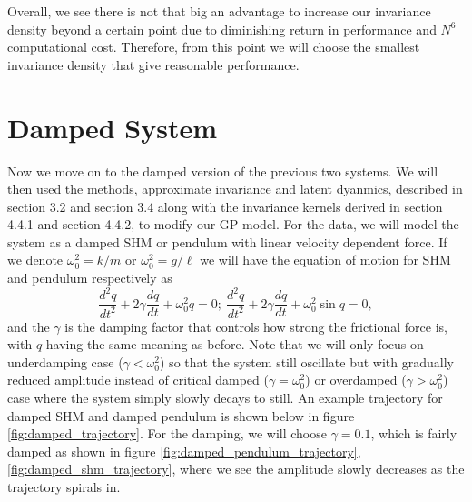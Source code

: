 \documentclass{statsmsc}
\begin{document}
Overall, we see there is not that big an advantage to increase our invariance density beyond a certain point due to diminishing return in performance and $N^6$ computational cost.
Therefore, from this point we will choose the smallest invariance density that give reasonable performance.  


\section{Damped System}
Now we move on to the damped version of the previous two systems. 
We will then used the methods, approximate invariance and latent dyanmics, described in section 3.2 and section 3.4 along with the invariance kernels derived in section 4.4.1 and section 4.4.2, to modify our GP model. 
For the data, we will model the system as a damped SHM or pendulum with linear velocity dependent force.
If we denote $\omega_0^2=k/m$ or $\omega_0^2=g/\ell$
we will have the equation of motion for SHM and pendulum respectively as
$$
\frac{d^2q}{dt^2}+2\gamma\frac{dq}{dt}+\omega_0^2q=0;\ \frac{d^2q}{dt^2}+2\gamma\frac{dq}{dt}+\omega_0^2\sin q=0 ,
$$
and the $\gamma$ is the damping factor that controls how strong the frictional force is, with $q$ having the same meaning as before. 
Note that we will only focus on underdamping case ($\gamma < \omega_0^2$) so that the system still oscillate but with gradually reduced amplitude instead of critical damped ($\gamma=\omega_0^2$) or overdamped ($\gamma>\omega_0^2$) case where the system simply slowly decays to still.
An example trajectory for damped SHM and damped pendulum is shown below in figure \ref{fig:damped_trajectory}.
For the damping, we will choose $\gamma= 0.1$, which is fairly damped as shown in figure \ref{fig:damped_pendulum_trajectory}, \ref{fig:damped_shm_trajectory}, where we see the amplitude slowly decreases as the trajectory spirals in. 
\end{document}
